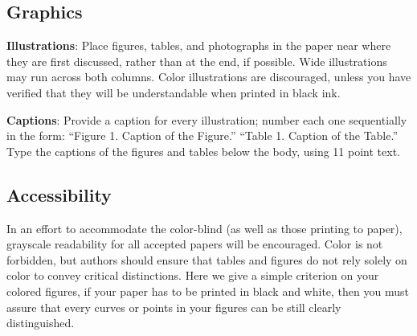 \documentclass[11pt,a4paper]{article}
\begin{document}
\subsection{Graphics}

{\bf Illustrations}: Place figures, tables, and photographs in the
paper near where they are first discussed, rather than at the end, if
possible.  Wide illustrations may run across both columns.  Color
illustrations are discouraged, unless you have verified that  
they will be understandable when printed in black ink.

{\bf Captions}: Provide a caption for every illustration; number each one
sequentially in the form:  ``Figure 1. Caption of the Figure.'' ``Table 1.
Caption of the Table.''  Type the captions of the figures and 
tables below the body, using 11 point text.

\subsection{Accessibility}
\label{ssec:accessibility}

In an effort to accommodate the color-blind (as well as those printing
to paper), grayscale readability for all accepted papers will be
encouraged.  Color is not forbidden, but authors should ensure that
tables and figures do not rely solely on color to convey critical
distinctions.
Here we give a simple criterion on your colored figures, if your paper has to be printed in black and white, then you must assure that every curves or points in your figures can be still clearly distinguished.



\end{document}
